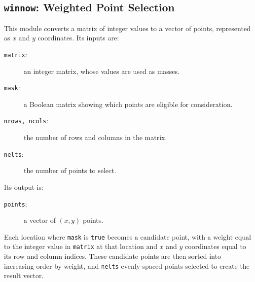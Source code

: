 \subsection{{\tt{winnow}}:
	Weighted Point Selection
	\label{s:toys-winnow}}

This module converts a matrix of integer values
to a vector of points,
represented as $x$ and $y$ coordinates.
Its inputs are:
\begin{description}
\item[{\tt{matrix}}:]
	an integer matrix, whose values are used as masses.
\item[{\tt{mask}}:]
	a Boolean matrix showing which points are eligible for consideration.
\item[{\tt{nrows, ncols}}:]
	the number of rows and columns in the matrix.
\item[{\tt{nelts}}:]
	the number of points to select.
\end{description}
Its output is:
\begin{description}
\item[{\tt{points}}:]
	a vector of $(x,y)$ points.
\end{description}
Each location where {\tt{mask}} is {\tt{true}}
becomes a candidate point,
with a weight equal to the integer value in {\tt{matrix}} at that location
and $x$ and $y$ coordinates
equal to its row and column indices.
These candidate points are then sorted into increasing order by weight,
and {\tt{nelts}} evenly-spaced points selected to create the result vector.
